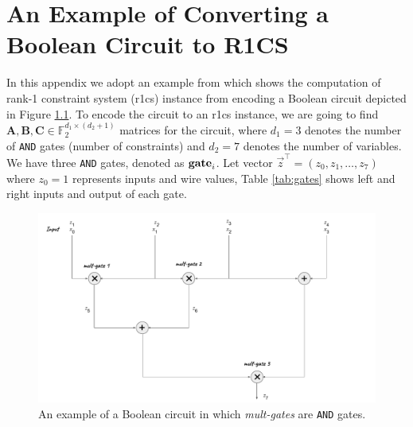 \chapter{An Example of Converting a Boolean Circuit to R1CS}\label{a_ch:r1cs_from_circuit}


In this appendix we adopt an example from \cite{Gong2024} which shows the computation of rank-1 constraint system (\gls{r1cs}) instance from encoding a Boolean circuit depicted in Figure \ref{fig:Arith-circuit}. To encode the circuit to an \gls{r1cs} instance, we are going to find $\mathbf{A}, \mathbf{B}, \mathbf{C} \in \mathbb{F}_2^{{d_1}\times{(d_2+1)}}$ matrices for the circuit, where $d_1 = 3$ denotes the number of  \texttt{AND} gates (number of constraints) and $d_2 = 7$ denotes the number of variables. We have three \texttt{AND} gates, denoted as $\text{\textbf{gate}}_i$. Let vector $\vec{z}^\intercal=(z_0, z_1, \ldots, z_7)$ where $z_0=1$ represents inputs and wire values, Table \ref{tab:gates} shows left and right inputs and output of each gate.

\begin{figure}[h]
	\centering
	\includegraphics[width=\textwidth]{Figures/Circuit.pdf}
	\caption[An Example of an Arithmetic Circuit]{An example of a Boolean circuit in which \textit{mult-gates} are  \texttt{AND} gates.}
	\label{fig:Arith-circuit}
\end{figure}




